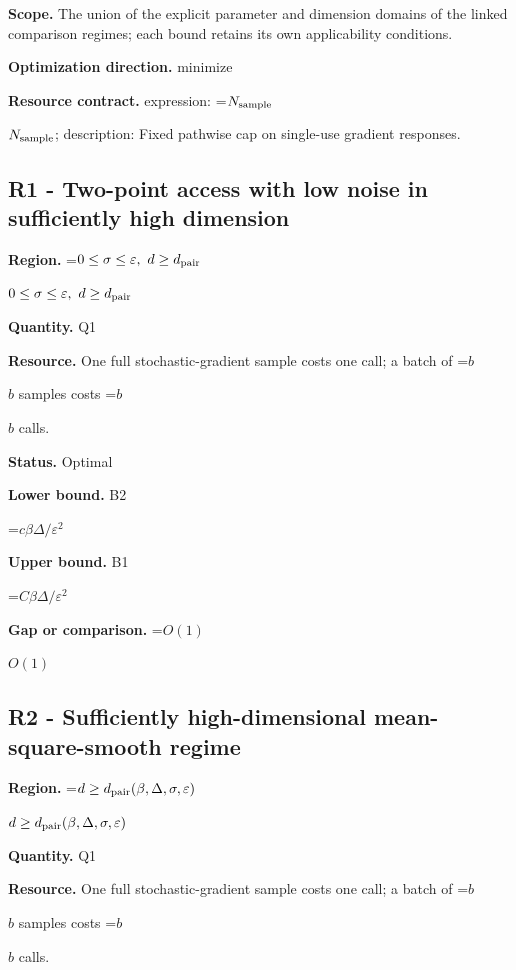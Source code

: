 \documentclass[10pt,a4paper]{article}
\newcommand{\AtlasMath}[1]{\par\begingroup\centering\setbox0=\hbox{$\displaystyle #1$}\ifdim\wd0>1.4\linewidth\typeout{ATLAS WIDE FORMULA: \the\wd0}\fi\ifdim\wd0>\linewidth\resizebox{\linewidth}{!}{\box0}\else\box0\fi\par\endgroup}
\newcommand{\AtlasInlineMath}[1]{\begingroup\setbox0=\hbox{$#1$}\ifdim\wd0>.4\linewidth\endgroup\AtlasMath{#1}\else\endgroup$#1$\fi}
\begin{document}
\textbf{Scope.} The union of the explicit parameter and dimension domains of the linked comparison regimes; each bound retains its own applicability conditions.



\textbf{Optimization direction.} minimize



\textbf{Resource contract.} expression: \AtlasInlineMath{N_{\rm sample}}; description: Fixed pathwise cap on single-use gradient responses.



\subsection{R1 - Two-point access with low noise in sufficiently high dimension}


\textbf{Region.} \AtlasInlineMath{0\le\sigma\le\varepsilon,\ d\ge d_{\rm pair}}



\textbf{Quantity.} Q1



\textbf{Resource.} One full stochastic-gradient sample costs one call; a batch of \AtlasInlineMath{b} samples costs \AtlasInlineMath{b} calls.



\textbf{Status.} Optimal



\textbf{Lower bound.} B2



\AtlasMath{c\beta\Delta/\varepsilon^2}


\textbf{Upper bound.} B1



\AtlasMath{C\beta\Delta/\varepsilon^2}


\textbf{Gap or comparison.} \AtlasInlineMath{O(1)}



\subsection{R2 - Sufficiently high-dimensional mean-square-smooth regime}


\textbf{Region.} \AtlasInlineMath{d\ge d_{\rm pair}(\beta,\Delta,\sigma,\varepsilon)}



\textbf{Quantity.} Q1



\textbf{Resource.} One full stochastic-gradient sample costs one call; a batch of \AtlasInlineMath{b} samples costs \AtlasInlineMath{b} calls.
\end{document}
